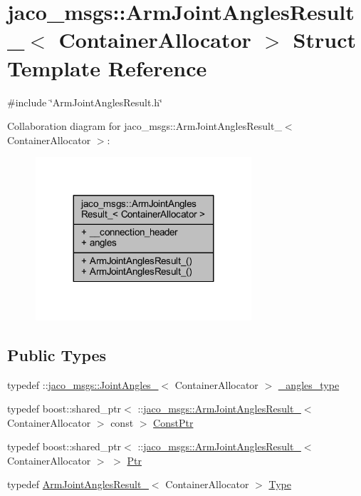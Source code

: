\hypertarget{structjaco__msgs_1_1ArmJointAnglesResult__}{}\section{jaco\+\_\+msgs\+:\+:Arm\+Joint\+Angles\+Result\+\_\+$<$ Container\+Allocator $>$ Struct Template Reference}
\label{structjaco__msgs_1_1ArmJointAnglesResult__}


{\ttfamily \#include \char`\"{}Arm\+Joint\+Angles\+Result.\+h\char`\"{}}



Collaboration diagram for jaco\+\_\+msgs\+:\+:Arm\+Joint\+Angles\+Result\+\_\+$<$ Container\+Allocator $>$\+:
\nopagebreak
\begin{figure}[H]
\begin{center}
\leavevmode
\includegraphics[width=227pt]{dc/dc0/structjaco__msgs_1_1ArmJointAnglesResult____coll__graph}
\end{center}
\end{figure}
\subsection*{Public Types}
\begin{DoxyCompactItemize}
\item 
typedef \+::\hyperlink{structjaco__msgs_1_1JointAngles__}{jaco\+\_\+msgs\+::\+Joint\+Angles\+\_\+}$<$ Container\+Allocator $>$ \hyperlink{structjaco__msgs_1_1ArmJointAnglesResult___a555b513327e037ed98d9cb6934f77955}{\+\_\+angles\+\_\+type}
\item 
typedef boost\+::shared\+\_\+ptr$<$ \+::\hyperlink{structjaco__msgs_1_1ArmJointAnglesResult__}{jaco\+\_\+msgs\+::\+Arm\+Joint\+Angles\+Result\+\_\+}$<$ Container\+Allocator $>$ const  $>$ \hyperlink{structjaco__msgs_1_1ArmJointAnglesResult___adabfeb1259a1084e46b53afa91fca67b}{Const\+Ptr}
\item 
typedef boost\+::shared\+\_\+ptr$<$ \+::\hyperlink{structjaco__msgs_1_1ArmJointAnglesResult__}{jaco\+\_\+msgs\+::\+Arm\+Joint\+Angles\+Result\+\_\+}$<$ Container\+Allocator $>$ $>$ \hyperlink{structjaco__msgs_1_1ArmJointAnglesResult___a49364d2e8ebfc28e2fa4dcfde4ff835a}{Ptr}
\item 
typedef \hyperlink{structjaco__msgs_1_1ArmJointAnglesResult__}{Arm\+Joint\+Angles\+Result\+\_\+}$<$ Container\+Allocator $>$ \hyperlink{structjaco__msgs_1_1ArmJointAnglesResult___a6e6be010aac48d148847304830e84eb3}{Type}
\end{DoxyCompactItemize}
